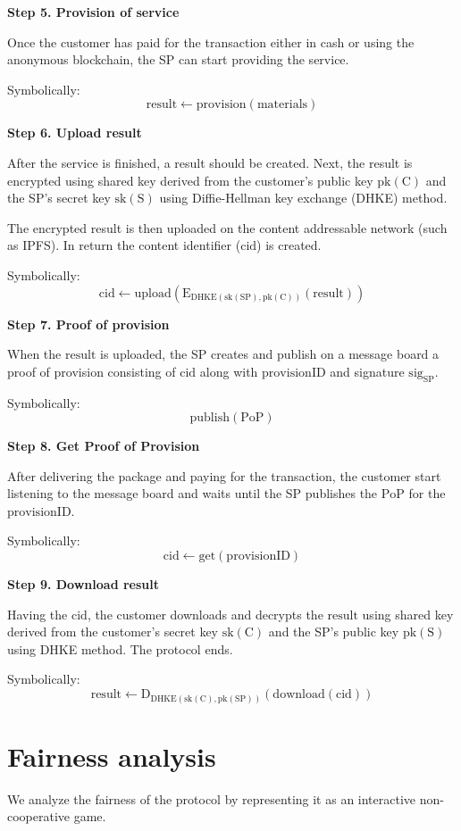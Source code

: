 \documentclass{ieeeaccess}
\begin{document}
\noindent \textbf
{Step 5. Provision of service}\label{step-5-provision-of-service} 

Once the customer has paid for the transaction either in cash or using the anonymous blockchain, the SP can start providing the service.

Symbolically: 
\[
\mathrm{result \gets provision(materials)}
\]

\noindent \textbf
{Step 6. Upload result}\label{step-6-upload-result}

After the service is finished, a result should be created. 
Next, the result is encrypted using shared key derived from the customer's public key $\mathrm{pk(C)}$ and the SP's secret key $\mathrm{sk(S)}$ using Diffie-Hellman key exchange (DHKE) method.

The encrypted result is then uploaded on the content addressable network (such as IPFS). In return the content identifier ($\mathrm{cid}$) is created.

Symbolically: 
\[
\mathrm{cid \gets upload(E_{DHKE(sk(SP), pk(C))}(result))}
\]

\noindent \textbf
{Step 7. Proof of provision}\label{step-7-proof-of-provision}

When the $\mathrm{result}$ is uploaded, the SP creates and publish on a message board a proof of provision consisting of $\mathrm{cid}$ along with $\mathrm{provisionID}$ and signature $\mathrm{sig}_\mathrm{SP}$.

Symbolically: 
\[
\mathrm{publish(PoP)}
\]

\noindent \textbf
{Step 8. Get Proof of Provision}\label{step-8-get-proof-of-provision}

After delivering the package and paying for the transaction, the customer start listening to the message board and waits until the SP publishes the $\mathrm{PoP}$ for the $\mathrm{provisionID}$.

Symbolically: 
\[
\mathrm{cid \gets get(provisionID)}
\]

\noindent \textbf
{Step 9. Download result}\label{step-9-download-result}

Having the $\mathrm{cid}$, the customer downloads and decrypts the $\mathrm{result}$ using shared key derived from the customer's secret key $\mathrm{sk(C)}$ and the SP's public key $\mathrm{pk(S)}$ using DHKE method. The protocol ends.

Symbolically: 
\[
\mathrm{result \gets D_{DHKE(sk(C), pk(SP))}(download(cid))}
\]

\section{Fairness analysis}\label{sec:fairness-analysis}
We analyze the fairness of the protocol by representing it as an interactive non-cooperative game.
\end{document}
